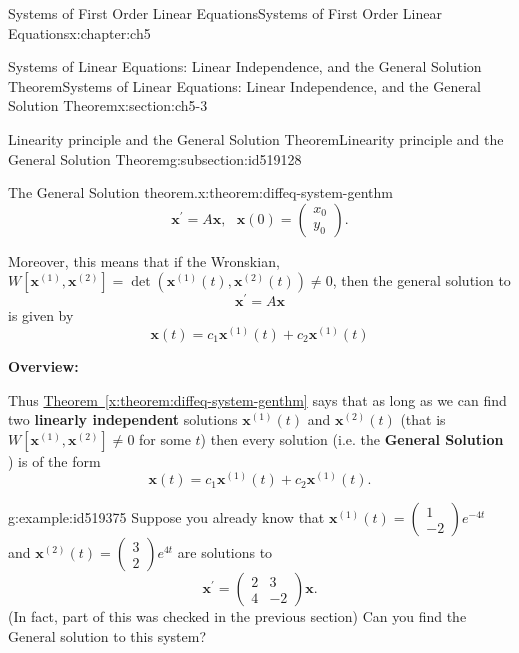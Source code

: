 \documentclass[oneside,10pt,]{book}
\newcommand{\xreffont}{\relax}
\newcommand{\terminology}[1]{\textbf{#1}}
\numberwithin{equation}{section}
\numberwithin{equation}{section}
\newcommand{\amp}{&}
\begin{document}
\begin{chapterptx}{Systems of First Order Linear Equations}{}{Systems of First Order Linear Equations}{}{}{x:chapter:ch5}
\begin{sectionptx}{Systems of Linear Equations: Linear Independence, and the General Solution Theorem}{}{Systems of Linear Equations: Linear Independence, and the General Solution Theorem}{}{}{x:section:ch5-3}
\begin{subsectionptx}{Linearity principle and the General Solution Theorem}{}{Linearity principle and the General Solution Theorem}{}{}{g:subsection:id519128}
\begin{theorem}{The General Solution theorem.}{}{x:theorem:diffeq-system-genthm}
\begin{equation*}
\mathbf{x}^{\prime}=A\mathbf{x},\,\,\,\,\mathbf{x}(0)=\left(\begin{array}{c}
x_{0}\\
y_{0}
\end{array}\right).
\end{equation*}
%
\par
Moreover, this means that if the Wronskian, \(W\left[\mathbf{x}^{(1)},\mathbf{x}^{(2)}\right]=\det\left(\mathbf{x}^{(1)}(t),\mathbf{x}^{(2)}(t)\right)\neq0\), then the general solution to%
\begin{equation*}
\mathbf{x}^{\prime}=A\mathbf{x}
\end{equation*}
is given by%
\begin{equation*}
\mathbf{x}(t)=c_{1}\mathbf{x}^{(1)}(t)+c_{2}\mathbf{x}^{(1)}(t)
\end{equation*}
%
\end{theorem}
\terminology{Overview:}%
\par
Thus \hyperref[x:theorem:diffeq-system-genthm]{Theorem~{\xreffont\ref{x:theorem:diffeq-system-genthm}}} says that as long as we can find two \terminology{linearly independent} solutions \(\mathbf{x}^{(1)}(t)\) and \(\mathbf{x}^{(2)}(t)\) (that is \(W\left[\mathbf{x}^{(1)},\mathbf{x}^{(2)}\right]\neq 0\) for some \(t\)) then every solution (i.e. the \terminology{General Solution} ) is of the form%
\begin{equation*}
\mathbf{x}(t)=c_{1}\mathbf{x}^{(1)}(t)+c_{2}\mathbf{x}^{(1)}(t).
\end{equation*}
%
\begin{example}{}{g:example:id519375}%
Suppose you already know that \(\mathbf{x}^{(1)}(t)=\left(\begin{array}{c}
1\\
-2
\end{array}\right)e^{-4t}\) and \(\mathbf{x}^{(2)}(t)=\left(\begin{array}{c}
3\\
2
\end{array}\right)e^{4t}\) are solutions to%
\begin{equation*}
\mathbf{x}^{\prime}=\left(\begin{array}{cc}
2 \amp 3\\
4 \amp -2
\end{array}\right)\mathbf{x}.
\end{equation*}
(In fact, part of this was checked in the previous section) Can you find the General solution to this system?%
\par

\end{example}
\end{subsectionptx}
\end{sectionptx}
\end{chapterptx}
\end{document}
